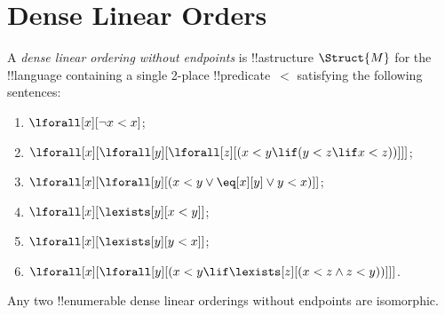 \documentclass[../../../include/open-logic-section]{subfiles}
\begin{document}
\section{Dense Linear Orders}

\begin{defn}
  A \emph{dense linear ordering without endpoints} is !!a{structure}
  $\Struct{M}$ for the !!{language} containing a single 2-place
  !!{predicate}~$<$ satisfying the following sentences:
  \begin{enumerate}
  \item $\lforall[x][\lnot x < x]$;
  \item $\lforall[x][\lforall[y][\lforall[z][(x < y \lif (y < z \lif x
    <z ))]]]$;
  \item $\lforall[x][\lforall[y][(x< y \lor \eq[x][y] \lor y < x)]]$;
  \item $\lforall[x][\lexists[y][x < y]]$;
  \item $\lforall[x][\lexists[y][y < x]]$;
  \item $\lforall[x][\lforall[y][(x < y \lif \lexists[z][(x < z \land
        z < y))]]]$.
 \end{enumerate}
\end{defn}

\begin{thm}
  Any two !!{enumerable} dense linear orderings without
  endpoints are isomorphic.
\end{thm}
\end{document}
